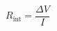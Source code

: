 \documentclass[preview]{standalone}
\begin{document}
\[R_\text{int} = \frac{\Delta V}{I}\]
\end{document}
